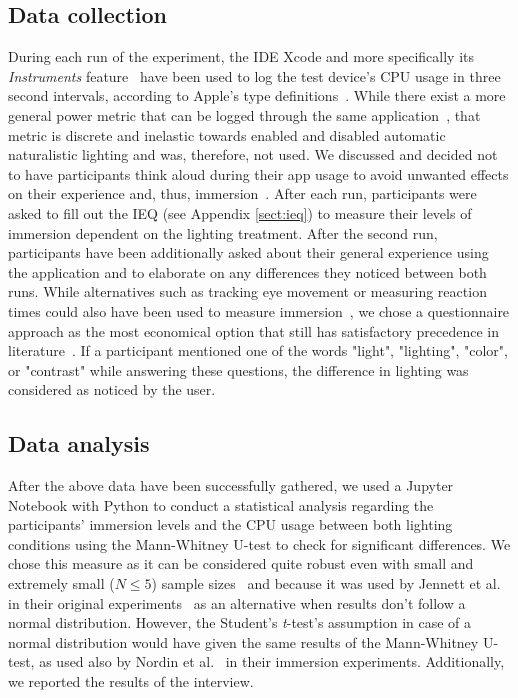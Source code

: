 \documentclass[12pt,twoside,english]{article}
\begin{document}
\subsection{Data collection}
\label{sect:data_collection}

During each run of the experiment, the \gls{IDE} Xcode and more specifically its \textit{Instruments} feature~\cite{apple_xcode_2020} have been used to log the test device's \gls{CPU} usage in three second intervals, according to Apple's type definitions~\cite{apple_system_2020}.
While there exist a more general power metric that can be logged through the same application~\cite{apple_energy_2020-1}, that metric is discrete and inelastic towards enabled and disabled automatic naturalistic lighting and was, therefore, not used.
We discussed and decided not to have participants think aloud during their app usage to avoid unwanted effects on their experience and, thus, immersion~\cite{van_den_haak_retrospective_2003}.
After each run, participants were asked to fill out the \gls{IEQ} (see Appendix \ref{sect:ieq}) to measure their levels of immersion dependent on the lighting treatment.
After the second run, participants have been additionally asked about their general experience using the application and to elaborate on any differences they noticed between both runs.
While alternatives such as tracking eye movement or measuring reaction times could also have been used to measure immersion~\cite{jennett_measuring_2008}, we chose a questionnaire approach as the most economical option that still has satisfactory precedence in literature~\cite{boyle_engagement_2012}.
If a participant mentioned one of the words "light", "lighting", "color", or "contrast" while answering these questions, the difference in lighting was considered as noticed by the user.

\subsection{Data analysis}
\label{sect:data_analysis}

After the above data have been successfully gathered, we used a Jupyter Notebook with Python to conduct a statistical analysis regarding the participants' immersion levels and the \gls{CPU} usage between both lighting conditions using the Mann-Whitney U-test to check for significant differences.
We chose this measure as it can be considered quite robust even with small and extremely small ($ N \leq 5 $) sample sizes~\cite{de_winter_using_2013} and because it was used by Jennett et al. in their original experiments~\cite{jennett_measuring_2008} as an alternative when results don't follow a normal distribution.
However, the Student's \textit{t}-test's assumption in case of a normal distribution would have given the same results of the Mann-Whitney U-test, as used also by Nordin et al.~\cite{nordin_attention_2013} in their immersion experiments.
Additionally, we reported the results of the interview.
\end{document}
